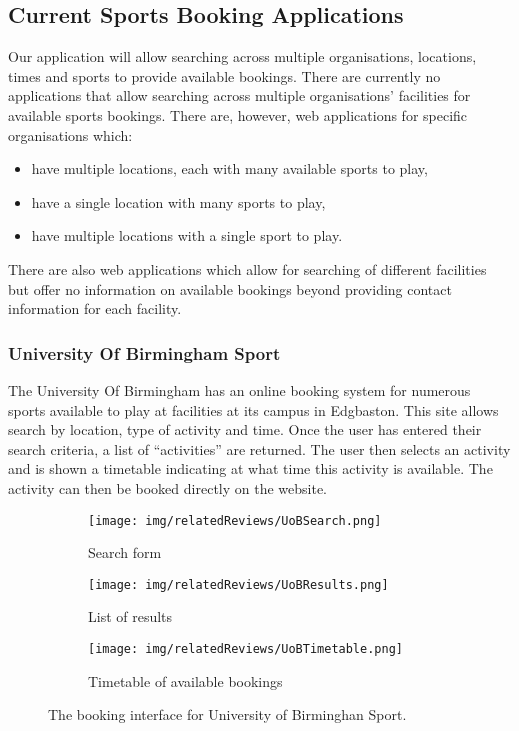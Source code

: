 \subsection{Current Sports Booking Applications}
\label{sub:current_sports_booking_applications}

Our application will allow searching across multiple organisations, locations,
times and sports to provide available bookings. There are currently no
applications that allow searching across multiple organisations' facilities for
available sports bookings. There are, however, web applications for specific
organisations which:
\begin{itemize}
	\item have multiple locations, each with many available sports to play,
	\item have a single location with many sports to play,
	\item have multiple locations with a single sport to play.
\end{itemize}
There are also web applications which allow for searching of different
facilities but offer no information on available bookings beyond providing
contact information for each facility.

\subsubsection{University Of Birmingham Sport}
\label{ssub:university_of_birmingham_sport}

The University Of Birmingham has an online booking system for numerous sports
available to play at facilities at its campus in Edgbaston\cite{UOBSport}. This
site allows search by location, type of activity and time. Once the user has
entered their search criteria, a list of ``activities'' are returned. The user
then selects an activity and is shown a timetable indicating at what time this
activity is available. The activity can then be booked directly on the website.
\begin{figure}[ht]
	\centering
	\begin{subfigure}[b]{0.4\textwidth}
		\texttt{[image: img/relatedReviews/UoBSearch.png]}
		\caption{Search form}\label{fig:UoBSearch}
	\end{subfigure}%
	\qquad
	\begin{subfigure}[b]{0.4\textwidth}
		\texttt{[image: img/relatedReviews/UoBResults.png]}
		\caption{List of results}\label{fig:UoBResults}
	\end{subfigure}
	\qquad
	\begin{subfigure}[b]{0.7\textwidth}
		\texttt{[image: img/relatedReviews/UoBTimetable.png]}
		\caption{Timetable of available bookings}\label{fig:UoBTimetable}
	\end{subfigure}
	\caption{The booking interface for University of Birminghan Sport.
	}\label{fig:animals}
\end{figure}

